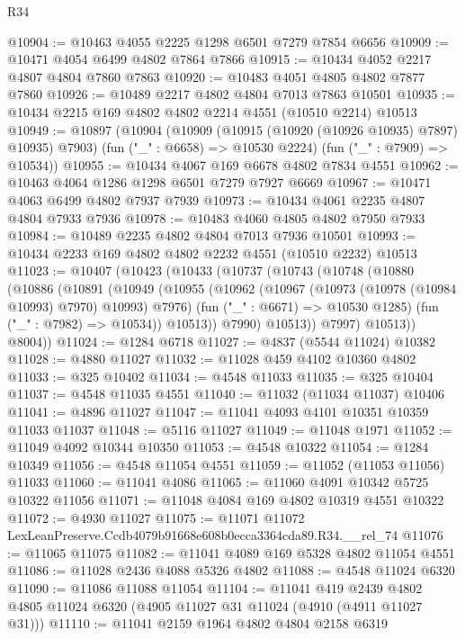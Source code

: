 \begin{lexlean}{R34}
\begin{coremodule}
@10904 := @10463 @4055 @2225 @1298 @6501 @7279 @7854 @6656
@10909 := @10471 @4054 @6499 @4802 @7864 @7866
@10915 := @10434 @4052 @2217 @4807 @4804 @7860 @7863
@10920 := @10483 @4051 @4805 @4802 @7877 @7860
@10926 := @10489 @2217 @4802 @4804 @7013 @7863 @10501
@10935 := @10434 @2215 @169 @4802 @4802 @2214 @4551 (@10510 @2214) @10513
@10949 := @10897
    (@10904
      (@10909 (@10915 (@10920 (@10926 @10935) @7897) @10935) @7903)
      (fun ("_" : @6658) => @10530 @2224)
      (fun ("_" : @7909) => @10534))
@10955 := @10434 @4067 @169 @6678 @4802 @7834 @4551
@10962 := @10463 @4064 @1286 @1298 @6501 @7279 @7927 @6669
@10967 := @10471 @4063 @6499 @4802 @7937 @7939
@10973 := @10434 @4061 @2235 @4807 @4804 @7933 @7936
@10978 := @10483 @4060 @4805 @4802 @7950 @7933
@10984 := @10489 @2235 @4802 @4804 @7013 @7936 @10501
@10993 := @10434 @2233 @169 @4802 @4802 @2232 @4551 (@10510 @2232) @10513
@11023 := @10407
    (@10423
      (@10433
        (@10737
          (@10743
            (@10748
              (@10880
                (@10886
                  (@10891
                    (@10949
                      (@10955
                        (@10962
                          (@10967 (@10973 (@10978 (@10984 @10993) @7970) @10993) @7976)
                          (fun ("_" : @6671) => @10530 @1285)
                          (fun ("_" : @7982) => @10534))
                        @10513))
                    @7990)
                  @10513))
              @7997)
            @10513))
        @8004))
@11024 := @1284 @6718
@11027 := @4837 (@5544 @11024) @10382
@11028 := @4880 @11027
@11032 := @11028 @459 @4102 @10360 @4802
@11033 := @325 @10402
@11034 := @4548 @11033
@11035 := @325 @10404
@11037 := @4548 @11035 @4551
@11040 := @11032 (@11034 @11037) @10406
@11041 := @4896 @11027
@11047 := @11041 @4093 @4101 @10351 @10359 @11033 @11037
@11048 := @5116 @11027
@11049 := @11048 @1971
@11052 := @11049 @4092 @10344 @10350
@11053 := @4548 @10322
@11054 := @1284 @10349
@11056 := @4548 @11054 @4551
@11059 := @11052 (@11053 @11056) @11033
@11060 := @11041 @4086
@11065 := @11060 @4091 @10342 @5725 @10322 @11056
@11071 := @11048 @4084 @169 @4802 @10319 @4551 @10322
@11072 := @4930 @11027
@11075 := @11071 @11072 LexLeanPreserve.Ccdb4079b91668e608b0ecca3364cda89.R34.__rel_74
@11076 := @11065 @11075
@11082 := @11041 @4089 @169 @5328 @4802 @11054 @4551
@11086 := @11028 @2436 @4088 @5326 @4802
@11088 := @4548 @11024 @6320
@11090 := @11086 @11088 @11054
@11104 := @11041
    @419
    @2439
    @4802
    @4805
    @11024
    @6320
    (@4905 @11027 @31 @11024 (@4910 (@4911 @11027 @31)))
@11110 := @11041 @2159 @1964 @4802 @4804 @2158 @6319

\end{coremodule}
\end{lexlean}
